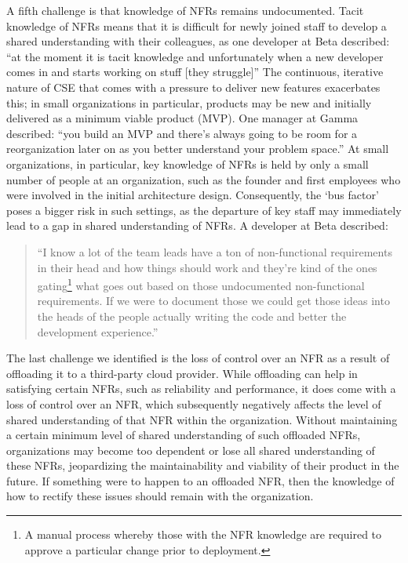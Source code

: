 \documentclass[smallextended]{svjour3}       %
\begin{document}
A fifth challenge is that knowledge of NFRs remains undocumented. Tacit knowledge of NFRs means that it is difficult for newly joined staff to develop a shared understanding with their colleagues, as one developer at Beta described:
\textmd{``at the moment it is tacit knowledge and unfortunately when a new developer comes in and starts working on stuff [they struggle]''}
The continuous, iterative nature of CSE that comes with a pressure to deliver new features exacerbates this; in small organizations in particular, products may be new and initially delivered as a minimum viable product (MVP). One manager at Gamma described:
\textmd{``you build an MVP and there's always going to be room for a reorganization later on as you better understand your problem space.''}
At small organizations, in particular, key knowledge of NFRs is held by only a small number of people at an organization, such as the founder and first employees who were involved in the initial architecture design. Consequently, the `bus factor' poses a bigger risk in such settings, as the departure of key staff may immediately lead to a gap in shared understanding of NFRs.
A developer at Beta described:
\begin{quote}
    ``I know a lot of the team leads have a ton of non-functional requirements in their head and how things should work and they're kind of the ones gating\footnote{A manual process whereby those with the NFR knowledge are required to approve a particular change prior to deployment.} what goes out based on those undocumented non-functional requirements. If we were to document those we could get those ideas into the heads of the people actually writing the code and better the development experience.''
\end{quote}




The last challenge we identified is the loss of control over an NFR as a result of offloading it to a third-party cloud provider.
While offloading can help in satisfying certain NFRs, such as reliability and performance, it does come with a loss of control over an NFR, which subsequently negatively affects the level of shared understanding of that NFR within the organization. 
Without maintaining a certain minimum level of shared understanding of such offloaded NFRs, organizations may become too dependent or lose all shared understanding of these NFRs, jeopardizing the maintainability and viability of their product in the future. If something were to happen to an offloaded NFR, then the knowledge of how to rectify these issues should remain with the organization.
\end{document}
